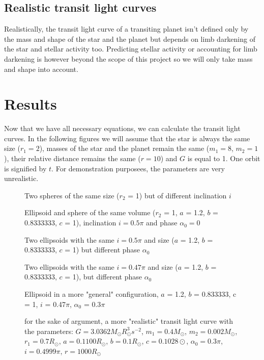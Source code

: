 \documentclass[10pt]{article}
\numberwithin{equation}{subsection}
\begin{document}
\subsection{Realistic transit light curves}
Realistically, the transit light curve of a transiting planet isn't defined only by
the mass and shape of the star and the planet but depends on limb darkening of the star
and stellar activity too. Predicting stellar activity or accounting for limb darkening
is however beyond the scope of this project so we will only take mass and shape into
account.
\section{Results}
Now that we have all necessary equations, we can calculate the transit light curves.
In the following figures we will assume that the star is always the same size ($r_1 = 2$),
masses of the star and the planet remain the same ($m_1 = 8$, $m_2 = 1$), their relative
distance remains the same ($r = 10$) and $G$ is equal to 1. One orbit is signified by $t$.
For demonstration purposees, the parameters are very unrealistic.
\begin{figure}[H]
  \centering
  
  \caption{Two spheres of the same size ($r_2$ = 1) but of different inclination $i$}
\end{figure}
\begin{figure}[H]
  \centering
  
  \caption{Ellipsoid and sphere of the same volume ($r_2$ = 1, $a$ = 1.2, $b$ = 0.8333333, $c$ = 1), inclination $i=0.5\pi$ and phase $\alpha_0 = 0$}
\end{figure}
\begin{figure}[H]
  \centering
  
  \caption{Two ellipsoids with the same $i = 0.5\pi$ and size ($a$ = 1.2, $b$ = 0.8333333, $c$ = 1) but different phase $\alpha_0$}
\end{figure}
\begin{figure}[H]
  \centering
  
  \caption{Two ellipsoids with the same $i = 0.47\pi$ and size ($a$ = 1.2, $b$ = 0.8333333, $c$ = 1), but different phase $\alpha_0$}
\end{figure}
\begin{figure}[H]
  \centering
  
  \caption{Ellipsoid in a more "general" configuration, $a$ = 1.2, $b$ = 0.833333, c = 1, $i$ = 0.47$\pi$, $\alpha_0$ = 0.3$\pi$}
\end{figure}
\begin{figure}[H]
  \centering
  
  \caption{for the sake of argument, a more "realistic" transit light curve with the parameters:
  $G = 3.0362M_\odot R^3_\odot s^{-2}$, $m_1 = 0.4M_\odot$, $m_2 = 0.002M_\odot$, $r_1 = 0.7R_\odot$, $a = 0.1100R_\odot$, $b = 0.1R_\odot$, $c = 0.1028\odot$, $\alpha_0 = 0.3\pi$, $i = 0.4999\pi$, $r = 1000R_\odot$}
  \label{fig:6}
\end{figure}
\end{document}
